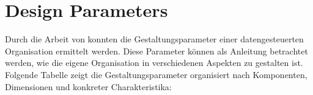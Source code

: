 
\section{Design Parameters}

Durch die Arbeit von  konnten die Gestaltungsparameter einer datengesteuerten Organisation ermittelt werden.
Diese Parameter können als Anleitung betrachtet werden, wie die eigene Organisation in verschiedenen Aspekten zu gestalten ist.
Folgende Tabelle zeigt die Gestaltungsparameter organisiert nach Komponenten, Dimensionen und konkreter Charakteristika:

